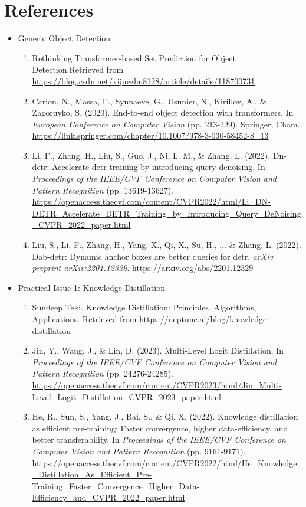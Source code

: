 \documentclass[10pt,a4paper]{article}
\begin{document}
\section*{References}
\begin{itemize}

\item Generic Object Detection
\begin{enumerate}
\item Rethinking Transformer-based Set Prediction for Object Detection.Retrieved from \url{https://blog.csdn.net/xijuezhu8128/article/details/118700731}
\item Carion, N., Massa, F., Synnaeve, G., Usunier, N., Kirillov, A., \& Zagoruyko, S. (2020). End-to-end object detection with transformers. In \textit{European Conference on Computer Vision} (pp. 213-229). Springer, Cham. \url{https://link.springer.com/chapter/10.1007/978-3-030-58452-8_13}
\item Li, F., Zhang, H., Liu, S., Guo, J., Ni, L. M., \& Zhang, L. (2022). Dn-detr: Accelerate detr training by introducing query denoising. In \textit{Proceedings of the IEEE/CVF Conference on Computer Vision and Pattern Recognition} (pp. 13619-13627). \url{https://openaccess.thecvf.com/content/CVPR2022/html/Li_DN-DETR_Accelerate_DETR_Training_by_Introducing_Query_DeNoising_CVPR_2022_paper.html}
\item Liu, S., Li, F., Zhang, H., Yang, X., Qi, X., Su, H., ... \& Zhang, L. (2022). Dab-detr: Dynamic anchor boxes are better queries for detr. \textit{arXiv preprint arXiv:2201.12329}. \url{https://arxiv.org/abs/2201.12329}
\end{enumerate}

\item Practical Issue 1: Knowledge Distillation
\begin{enumerate}
\item Sundeep Teki. Knowledge Distillation: Principles, Algorithms, Applications. Retrieved from \url{https://neptune.ai/blog/knowledge-distillation}
\item Jin, Y., Wang, J., \& Lin, D. (2023). Multi-Level Logit Distillation. In \textit{Proceedings of the IEEE/CVF Conference on Computer Vision and Pattern Recognition} (pp. 24276-24285). \url{https://openaccess.thecvf.com/content/CVPR2023/html/Jin_Multi-Level_Logit_Distillation_CVPR_2023_paper.html}
\item He, R., Sun, S., Yang, J., Bai, S., \& Qi, X. (2022). Knowledge distillation as efficient pre-training: Faster convergence, higher data-efficiency, and better transferability. In \textit{Proceedings of the IEEE/CVF Conference on Computer Vision and Pattern Recognition} (pp. 9161-9171). \url{https://openaccess.thecvf.com/content/CVPR2022/html/He_Knowledge_Distillation_As_Efficient_Pre-Training_Faster_Convergence_Higher_Data-Efficiency_and_CVPR_2022_paper.html}
\end{enumerate}


\end{itemize}
\end{document}
